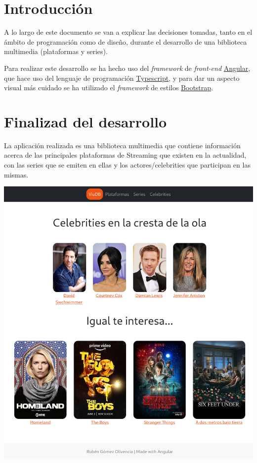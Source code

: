 \documentclass{\ClassPath/viu-tfm-template}
\begin{document}
    \graphicspath{{../../VIU_TFM_LaTeX_template/}}

    \coverpage

    \tableofcontents

\chapter{Introducción}

A lo largo de este documento se van a explicar las decisiones tomadas, tanto en el ámbito de programación como de diseño, durante el desarrollo de una biblioteca multimedia (plataformas y series).

Para realizar este desarrollo se ha hecho uso del \textit{framework} de \textit{front-end} \href{https://angular.io/}{Angular}, que hace uso del lenguaje de programación \href{https://www.typescriptlang.org/}{Typescript}, y para dar un aspecto visual más cuidado se ha utilizado el \textit{framework} de estilos \href{https://getbootstrap.com/}{Bootstrap}.

\chapter{Finalizad del desarrollo}

La aplicación realizada es una biblioteca multimedia que contiene información acerca de las principales plataformas de Streaming que existen en la actualidad, con las series que se emiten en ellas y los actores/celebrities que participan en las mismas.

\begin{center}
    \includegraphics[frame,width=0.6\linewidth]{img/inicio.png}
\end{center}
\end{document}
